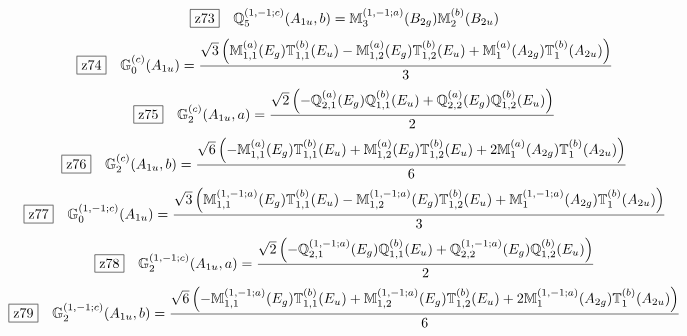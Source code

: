 \documentclass[fleqn,10pt,landscape]{jsarticle}
\begin{document}
\begin{dmath*}
\hspace*{3mm}\fbox{z73}\quad \mathbb{Q}_{5}^{(1,-1;c)}(A_{1u},b)=\mathbb{M}_{3}^{(1,-1;a)}(B_{2g}) \mathbb{M}_{2}^{(b)}(B_{2u})
\end{dmath*}
\begin{dmath*}
\hspace*{3mm}\fbox{z74}\quad \mathbb{G}_{0}^{(c)}(A_{1u})=\frac{\sqrt{3} \left(\mathbb{M}_{1,1}^{(a)}(E_{g}) \mathbb{T}_{1,1}^{(b)}(E_{u}) - \mathbb{M}_{1,2}^{(a)}(E_{g}) \mathbb{T}_{1,2}^{(b)}(E_{u}) + \mathbb{M}_{1}^{(a)}(A_{2g}) \mathbb{T}_{1}^{(b)}(A_{2u})\right)}{3}
\end{dmath*}
\begin{dmath*}
\hspace*{3mm}\fbox{z75}\quad \mathbb{G}_{2}^{(c)}(A_{1u},a)=\frac{\sqrt{2} \left(- \mathbb{Q}_{2,1}^{(a)}(E_{g}) \mathbb{Q}_{1,1}^{(b)}(E_{u}) + \mathbb{Q}_{2,2}^{(a)}(E_{g}) \mathbb{Q}_{1,2}^{(b)}(E_{u})\right)}{2}
\end{dmath*}
\begin{dmath*}
\hspace*{3mm}\fbox{z76}\quad \mathbb{G}_{2}^{(c)}(A_{1u},b)=\frac{\sqrt{6} \left(- \mathbb{M}_{1,1}^{(a)}(E_{g}) \mathbb{T}_{1,1}^{(b)}(E_{u}) + \mathbb{M}_{1,2}^{(a)}(E_{g}) \mathbb{T}_{1,2}^{(b)}(E_{u}) + 2 \mathbb{M}_{1}^{(a)}(A_{2g}) \mathbb{T}_{1}^{(b)}(A_{2u})\right)}{6}
\end{dmath*}
\begin{dmath*}
\hspace*{3mm}\fbox{z77}\quad \mathbb{G}_{0}^{(1,-1;c)}(A_{1u})=\frac{\sqrt{3} \left(\mathbb{M}_{1,1}^{(1,-1;a)}(E_{g}) \mathbb{T}_{1,1}^{(b)}(E_{u}) - \mathbb{M}_{1,2}^{(1,-1;a)}(E_{g}) \mathbb{T}_{1,2}^{(b)}(E_{u}) + \mathbb{M}_{1}^{(1,-1;a)}(A_{2g}) \mathbb{T}_{1}^{(b)}(A_{2u})\right)}{3}
\end{dmath*}
\begin{dmath*}
\hspace*{3mm}\fbox{z78}\quad \mathbb{G}_{2}^{(1,-1;c)}(A_{1u},a)=\frac{\sqrt{2} \left(- \mathbb{Q}_{2,1}^{(1,-1;a)}(E_{g}) \mathbb{Q}_{1,1}^{(b)}(E_{u}) + \mathbb{Q}_{2,2}^{(1,-1;a)}(E_{g}) \mathbb{Q}_{1,2}^{(b)}(E_{u})\right)}{2}
\end{dmath*}
\begin{dmath*}
\hspace*{3mm}\fbox{z79}\quad \mathbb{G}_{2}^{(1,-1;c)}(A_{1u},b)=\frac{\sqrt{6} \left(- \mathbb{M}_{1,1}^{(1,-1;a)}(E_{g}) \mathbb{T}_{1,1}^{(b)}(E_{u}) + \mathbb{M}_{1,2}^{(1,-1;a)}(E_{g}) \mathbb{T}_{1,2}^{(b)}(E_{u}) + 2 \mathbb{M}_{1}^{(1,-1;a)}(A_{2g}) \mathbb{T}_{1}^{(b)}(A_{2u})\right)}{6}
\end{dmath*}
\end{document}

